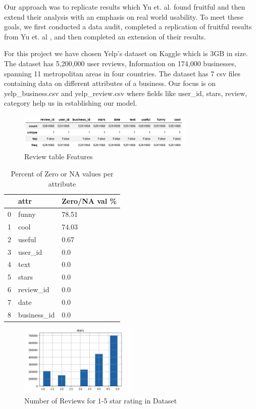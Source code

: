 \documentclass[12pt]{article}
\begin{document}
Our approach was to replicate results which Yu et. al. \cite{yu2015restaurants} found
fruitful and then extend their analysis with an emphasis on real world usability. To meet
these goals, we first conducted a data audit, completed a replication of fruitful results
from Yu et. al \cite{yu2015restaurants}, and then completed an extension of their results.

For this project we have chosen Yelp’s dataset on Kaggle \cite{YelpData59:online}
which is 3GB in size. The dataset has 5,200,000 user reviews, Information on 174,000 businesses,
spanning 11 metropolitan areas in four countries. The dataset has 7 csv files containing data on
different attributes of a business. Our focus is on yelp\_business.csv and yelp\_review.csv where
fields like user\_id, stars, review, category help us in establishing our model.

\begin{figure}[h]
  \caption{Review table Features}
  \centering
  \includegraphics[width=0.75\textwidth]{review_table}
  \end{figure}
  
  \begin{table}[h]
	\caption{Percent of Zero or NA values per attribute}
	\centering
	\begin{tabular}{|l|l|l|}
	\hline
    \textbf{} & \textbf{attr} & \textbf{Zero/NA val \%} \\
	\hline 
	0         & funny     & 78.51    \\
	\hline 
	1         & cool      & 74.03  \\
 	\hline 
 	2 & useful      & 0.67    \\
 	\hline
 	3 & user_id      & 0.0   \\
 	\hline
 	4 & text      & 0.0    \\
 	\hline
 	5 & stars      & 0.0   \\
 	\hline
 	6 & review_id      & 0.0   \\
 	\hline
 	7 & date      & 0.0   \\
 	\hline
 	8 & business_id      & 0.0  \\
 	\hline
\end{tabular}
\end{table}
  
  \begin{figure}[h]
  \caption{Number of Reviews for 1-5 star rating in Dataset}
  \centering
  \includegraphics[width=0.5\textwidth]{rating}
  \end{figure}
\end{document}
